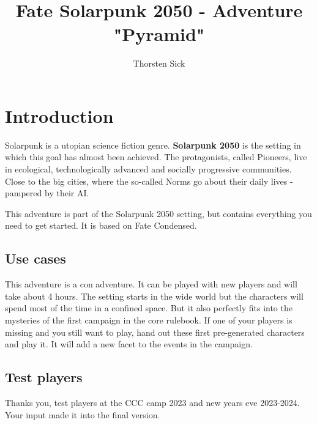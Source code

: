 \documentclass{book}
\title{Fate Solarpunk 2050 - Adventure "Pyramid"}
\author{Thorsten Sick}
\begin{document}

\chapter{Introduction}

Solarpunk is a utopian science fiction genre. \textbf{Solarpunk 2050} is the setting in which this goal has almost been achieved. The protagonists, called Pioneers, live in ecological, technologically advanced and socially progressive communities. Close to the big cities, where the so-called Norms go about their daily lives - pampered by their AI.

This adventure is part of the Solarpunk 2050 setting, but contains everything you need to get started. It is based on Fate Condensed.

\section{Use cases}

This adventure is a con adventure. It can be played with new players and will take about 4 hours. The setting starts in the wide world but the characters will spend most of the time in a confined space. But it also perfectly fits into the mysteries of the first campaign in the core rulebook. If one of your players is missing and you still want to play, hand out these first pre-generated characters and play it. It will add a new facet to the events in the campaign.

\section{Test players}

Thanks you, test players at the CCC camp 2023 and new years eve 2023-2024. Your input made it into the final version.


\end{document}
